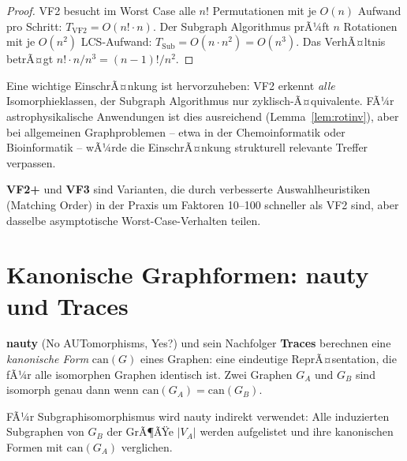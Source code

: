﻿\documentclass[a4paper,12pt]{report}
\theoremstyle{definition}
\begin{document}
\begin{proof}
VF2 besucht im Worst Case alle $n!$ Permutationen mit je $O(n)$ Aufwand pro Schritt: $T_\mathrm{VF2} = O(n! \cdot n)$. Der Subgraph Algorithmus prÃ¼ft $n$ Rotationen mit je $O(n^2)$ LCS-Aufwand: $T_\mathrm{Sub} = O(n \cdot n^2) = O(n^3)$. Das VerhÃ¤ltnis betrÃ¤gt $n! \cdot n / n^3 = (n-1)! / n^2$.
\end{proof}

Eine wichtige EinschrÃ¤nkung ist hervorzuheben: VF2 erkennt \emph{alle} Isomorphieklassen, der Subgraph Algorithmus nur zyklisch-Ã¤quivalente. FÃ¼r astrophysikalische Anwendungen ist dies ausreichend (Lemma~\ref{lem:rotinv}), aber bei allgemeinen Graphproblemen -- etwa in der Chemoinformatik oder Bioinformatik -- wÃ¼rde die EinschrÃ¤nkung strukturell relevante Treffer verpassen.

\textbf{VF2+} \cite{vf2plus2015} und \textbf{VF3} \cite{vf3_2018} sind Varianten, die durch verbesserte Auswahlheuristiken (Matching Order) in der Praxis um Faktoren 10--100 schneller als VF2 sind, aber dasselbe asymptotische Worst-Case-Verhalten teilen.

\section{Kanonische Graphformen: nauty und Traces}
\label{sec:related_nauty}

\textbf{nauty} (No AUTomorphisms, Yes?) \cite{mckay2014} und sein Nachfolger \textbf{Traces} berechnen eine \emph{kanonische Form} $\mathrm{can}(G)$ eines Graphen: eine eindeutige ReprÃ¤sentation, die fÃ¼r alle isomorphen Graphen identisch ist. Zwei Graphen $G_A$ und $G_B$ sind isomorph genau dann wenn $\mathrm{can}(G_A) = \mathrm{can}(G_B)$.

FÃ¼r Subgraphisomorphismus wird nauty indirekt verwendet: Alle induzierten Subgraphen von $G_B$ der GrÃ¶ÃŸe $|V_A|$ werden aufgelistet und ihre kanonischen Formen mit $\mathrm{can}(G_A)$ verglichen.
\end{document}
